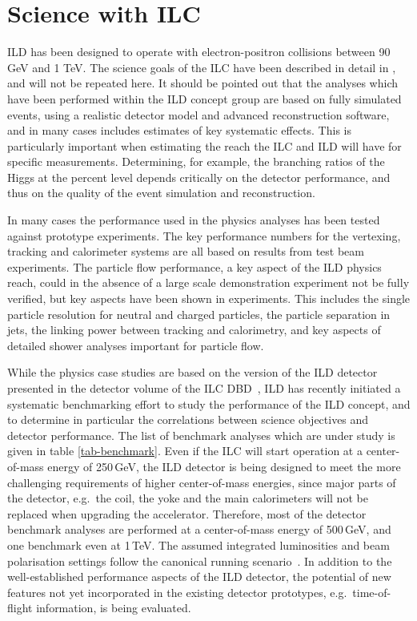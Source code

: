 \chapter{Science with ILC}

ILD has been designed to operate with electron-positron collisions between 90 GeV and 1 TeV. The science goals of the ILC have been described in detail in \cite{ILCESU1}, and will not be repeated here. It should be pointed out that the analyses which have been performed within the ILD concept group are based on fully simulated events, using a realistic detector model and advanced reconstruction software, and in many cases includes estimates of key systematic effects. This is particularly important when estimating the reach the ILC and ILD will have for specific measurements. Determining, for example, the branching ratios of the Higgs at the percent level depends critically on the detector performance, and thus on the quality of the event simulation and reconstruction. 

In many cases the performance used in the physics analyses has been tested against prototype experiments. The key performance numbers for the vertexing, tracking and calorimeter systems are all based on results from test beam experiments. The particle flow performance, a key aspect of the ILD physics reach, could in the absence of a large scale demonstration experiment not be fully verified, but key aspects have been shown in experiments. This includes the single particle resolution for neutral and charged particles, the particle separation in jets, the linking power between tracking and calorimetry, and key aspects of detailed shower analyses important for particle flow. 

While the physics case studies are based on the version of the ILD detector presented in the detector volume of the ILC DBD~\cite{Behnke:2013lya}, ILD has recently initiated a systematic benchmarking effort to study the performance of the ILD concept, and to determine in particular the correlations between science objectives and detector performance. The list of benchmark analyses which are under study is given in table \ref{tab-benchmark}. Even if the ILC will start operation at a center-of-mass energy of 250\,GeV, the ILD detector is being designed to meet the more challenging requirements of higher center-of-mass energies, since major parts of the detector, e.g.\ the coil, the yoke and the main calorimeters will not be replaced when upgrading the accelerator. Therefore, most of the detector benchmark analyses are performed at a center-of-mass energy of 500\,GeV, and one benchmark even at 1\,TeV. The assumed integrated luminosities and beam polarisation settings follow the canonical running scenario~\cite{Barklow:2015tja}. 
In addition to the well-established performance aspects of the ILD detector, the potential of new features not yet incorporated in the existing detector prototypes, e.g.\ time-of-flight information, is being evaluated. 

